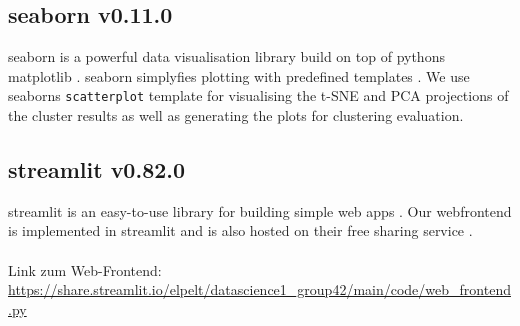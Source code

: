 \subsection[seaborn]{seaborn v0.11.0}
seaborn is a powerful data visualisation library build on top of pythons matplotlib \cite{Hunter:2007}. seaborn simplyfies plotting with predefined templates \cite{seaborn}. We use seaborns \texttt{scatterplot} template for visualising the t-SNE and PCA projections of the cluster results as well as generating the plots for clustering evaluation. 

\subsection[streamlit]{streamlit v0.82.0}
streamlit is an easy-to-use library for building simple web apps \cite{streamlit}. Our webfrontend is implemented in streamlit and is also hosted on their free sharing service .\\ 
\\

Link zum Web-Frontend: \\
\href{https://share.streamlit.io/elpelt/datascience1_group42/main/code/web_frontend.py}{https://share.streamlit.io/elpelt/datascience1\_group42/main/code/web\_frontend.py}